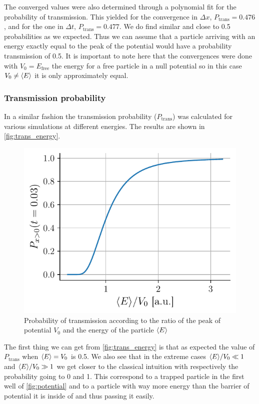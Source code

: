 The converged values were also determined through a polynomial fit for the probability of transmission. This yielded for the convergence in $\Delta x$, $P_\mathrm{trans} = 0.476$, and for the one in $\Delta t$, $P_\mathrm{trans} = 0.477$. We do find similar and close to 0.5 probabilities as we expected. Thus we can assume that a particle arriving with an energy exactly equal to the peak of the potential would have a probability transmission of 0.5. It is important to note here that the convergences were done with $V_0 = E_\mathrm{free}$ the energy for a free particle in a null potential so in this case $V_0 \neq \langle E \rangle$ it is only approximately equal.

\subsubsection{Transmission probability}
In a similar fashion the transmission probability ($P_\mathrm{trans}$) was calculated for various simulations at different energies. The results are shown in \autoref{fig:trans_energy}.
\begin{figure}[h]
    \centering
    \includegraphics[width = 0.6\linewidth]{figures/energy_probtrans.pdf}
    \caption{Probability of transmission according to the ratio of the peak of potential $V_0$ and the energy of the particle $\langle E \rangle$}
    \label{fig:trans_energy}
\end{figure}

The first thing we can get from \autoref{fig:trans_energy} is that as expected the value of $P_\mathrm{trans}$ when $\langle E \rangle = V_0$ is 0.5. We also see that in the extreme cases $\langle E \rangle/V_0 \ll 1$ and $\langle E \rangle/V_0 \gg 1$ we get closer to the classical intuition with respectively the probability going to 0 and 1. This correspond to a trapped particle in the first well of \autoref{fig:potential} and to a particle with way more energy than the barrier of potential it is inside of and thus passing it easily.


